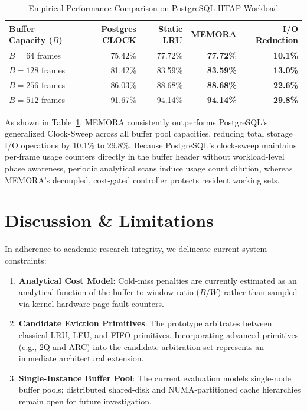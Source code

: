 \documentclass[conference]{IEEEtran}
\begin{document}
\begin{table}[htbp]
\caption{Empirical Performance Comparison on PostgreSQL HTAP Workload}
\label{tab:postgres_comparison}
\centering
\begin{tabular}{@{}lrrrr@{}}
\toprule
\textbf{Buffer Capacity ($B$)} & \textbf{Postgres CLOCK} & \textbf{Static LRU} & \textbf{MEMORA} & \textbf{I/O Reduction} \\
\midrule
$B = 64$ frames   & 75.42\% & 77.72\% & \textbf{77.72\%} & \textbf{10.1\%} \\
$B = 128$ frames  & 81.42\% & 83.59\% & \textbf{83.59\%} & \textbf{13.0\%} \\
$B = 256$ frames  & 86.03\% & 88.68\% & \textbf{88.68\%} & \textbf{22.6\%} \\
$B = 512$ frames  & 91.67\% & 94.14\% & \textbf{94.14\%} & \textbf{29.8\%} \\
\bottomrule
\end{tabular}
\end{table}

As shown in Table~\ref{tab:postgres_comparison}, MEMORA consistently outperforms PostgreSQL's generalized Clock-Sweep across all buffer pool capacities, reducing total storage I/O operations by 10.1\% to 29.8\%. Because PostgreSQL's clock-sweep maintains per-frame usage counters directly in the buffer header without workload-level phase awareness, periodic analytical scans induce usage count dilution, whereas MEMORA's decoupled, cost-gated controller protects resident working sets.

\section{Discussion \& Limitations}
In adherence to academic research integrity, we delineate current system constraints:
\begin{enumerate}
    \item \textbf{Analytical Cost Model}: Cold-miss penalties are currently estimated as an analytical function of the buffer-to-window ratio ($B/W$) rather than sampled via kernel hardware page fault counters.
    \item \textbf{Candidate Eviction Primitives}: The prototype arbitrates between classical LRU, LFU, and FIFO primitives. Incorporating advanced primitives (e.g., 2Q and ARC) into the candidate arbitration set represents an immediate architectural extension.
    \item \textbf{Single-Instance Buffer Pool}: The current evaluation models single-node buffer pools; distributed shared-disk and NUMA-partitioned cache hierarchies remain open for future investigation.
\end{enumerate}
\end{document}
